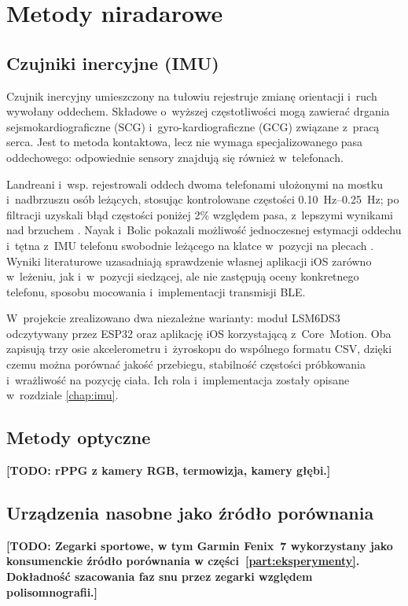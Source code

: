 \documentclass[12pt,a4paper,oneside]{report}
\newcommand{\todo}[1]{\textcolor{red!75!black}{\textbf{[TODO: #1]}}}
\newcommand{\miejsce}[1]{\todo{#1}}
\begin{document}
\chapter{Metody niradarowe}

\section{Czujniki inercyjne (IMU)}
Czujnik inercyjny umieszczony na tułowiu rejestruje zmianę orientacji i~ruch
wywołany oddechem. Składowe o~wyższej częstotliwości mogą zawierać drgania
sejsmokardiograficzne (SCG) i~gyro-kardiograficzne (GCG) związane z~pracą
serca. Jest to metoda kontaktowa, lecz nie wymaga specjalizowanego pasa
oddechowego: odpowiednie sensory znajdują się również w~telefonach.

Landreani i~wsp. rejestrowali oddech dwoma telefonami ułożonymi na mostku
i~nadbrzuszu osób leżących, stosując kontrolowane częstości
\SIrange{0.10}{0.25}{Hz}; po filtracji uzyskali błąd częstości poniżej 2\%
względem pasa, z~lepszymi wynikami nad brzuchem \cite{landreani2017}.
Nayak i~Bolic pokazali możliwość jednoczesnej estymacji oddechu i~tętna z~IMU
telefonu swobodnie leżącego na klatce w~pozycji na plecach
\cite{nayak2024}. Wyniki literaturowe uzasadniają sprawdzenie własnej aplikacji
iOS zarówno w~leżeniu, jak i~w~pozycji siedzącej, ale nie zastępują oceny
konkretnego telefonu, sposobu mocowania i~implementacji transmisji BLE.

W~projekcie zrealizowano dwa niezależne warianty: moduł LSM6DS3 odczytywany
przez ESP32 oraz aplikację iOS korzystającą z~Core~Motion. Oba zapisują trzy
osie akcelerometru i~żyroskopu do wspólnego formatu CSV, dzięki czemu można
porównać jakość przebiegu, stabilność częstości próbkowania i~wrażliwość na
pozycję ciała. Ich rola i~implementacja zostały opisane w~rozdziale
\ref{chap:imu}.

\section{Metody optyczne}
\miejsce{rPPG z kamery RGB, termowizja, kamery głębi.}

\section{Urządzenia nasobne jako źródło porównania}
\miejsce{Zegarki sportowe, w tym Garmin Fenix~7 wykorzystany jako konsumenckie
źródło porównania w części~\ref{part:eksperymenty}. Dokładność szacowania faz
snu przez zegarki względem polisomnografii.}
\end{document}

